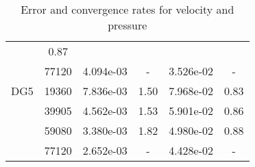 \begin{table}
\begin{center}
{\begin{tabular}{| l | c | c | c | c | c |}
                &0.87\\
                
            &77120
            
                &4.094e-03
                
                &-
                
                &3.526e-02
                
                &-\\
                \hline
        \hline
        \hspace{0.1cm}DG5\hspace{0.1cm}    
        
            &19360
            
                &7.836e-03
                
                &1.50
                
                &7.968e-02
                
                &0.83\\
                
            &39905
            
                &4.562e-03
                
                &1.53
                
                &5.901e-02
                
                &0.86\\
                
            &59080
            
                &3.380e-03
                
                &1.82
                
                &4.980e-02
                
                &0.88\\
                
            &77120
            
                &2.652e-03
                
                &-
                
                &4.428e-02
                
                &-\\
                \hline\end{tabular}}
    \end{center}
    \caption{Error and convergence rates for velocity and pressure}
    \label{tab:conv}
    \end{table}
